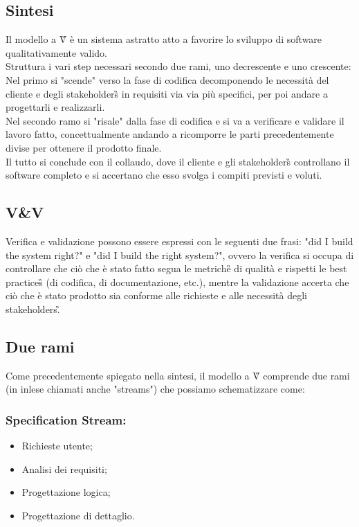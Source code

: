 \subsection{Sintesi}
Il modello a V\G{} è un sistema astratto atto a favorire lo sviluppo di software qualitativamente valido.\\
Struttura i vari step necessari secondo due rami, uno decrescente e uno crescente:\\
Nel primo si "scende" verso la fase di codifica decomponendo le necessità del cliente e degli stakeholders\G{}
in requisiti via via più specifici, per poi andare a progettarli e realizzarli.\\
Nel secondo ramo si "risale" dalla fase di codifica e si va a verificare e validare il lavoro fatto,
concettualmente andando a ricomporre le parti precedentemente divise per ottenere il prodotto finale.\\
Il tutto si conclude con il collaudo, dove il cliente e gli stakeholders\G{} controllano il software completo
e si accertano che esso svolga i compiti previsti e voluti. 

\subsection{V\&V}
Verifica e validazione possono essere espressi con le seguenti due frasi: "did I build the system right?"
e "did I build the right system?", ovvero la verifica si occupa di controllare che ciò che è stato
fatto segua le metriche\G{} di qualità e rispetti le best practices\G{} (di codifica, di documentazione, etc.), 
mentre la validazione accerta che ciò che è stato prodotto sia conforme alle
richieste e alle necessità degli stakeholders\G.

\subsection{Due rami}
Come precedentemente spiegato nella sintesi, il modello a V\G{} comprende due rami (in inlese chiamati anche
"streams") che possiamo schematizzare come: 
\subsubsection*{Specification Stream:}
\begin{itemize}
    \item Richieste utente;
    \item Analisi dei requisiti;
    \item Progettazione logica;
    \item Progettazione di dettaglio.
\end{itemize}

